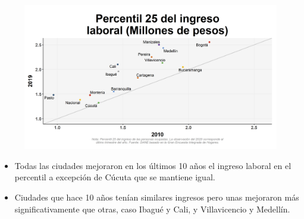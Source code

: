     \begin{figure}[H]
        \caption[Percentil 25 del ingreso laboral por ciudades principales - 2010 VS 2019 ]{\label{ingreso_laboral_25_ciudades_VS} }
        \begin{center}
        \includegraphics[width=\textwidth,keepaspectratio]{img/var_2_scatter_time.png}
        \end{center}
    \end{figure}
            \begin{itemize}
                    \item Todas las ciudades mejoraron en los últimos 10 años el ingreso laboral en el percentil a excepción de Cúcuta que se mantiene igual.
                    \item Ciudades que hace 10 años tenían similares ingresos pero unas mejoraron más significativamente que otras, caso Ibagué y Cali, y Villavicencio y Medellín.
                \end{itemize}

